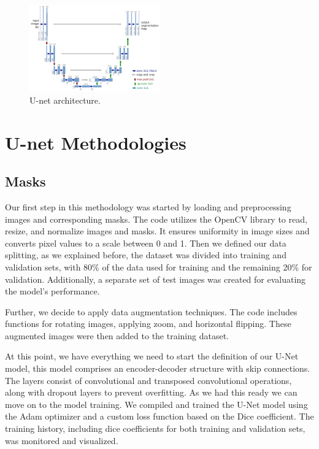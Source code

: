 \documentclass[runningheads]{llncs}
\begin{document}
\begin{figure}[H]
  \centering
  \includegraphics[width=0.5\textwidth]{u-net-architecture.png}
  \caption{U-net architecture.}
  \label{fig:unet}
\end{figure}

\section{U-net Methodologies}
\subsection{Masks}
Our first step in this methodology was started by loading and preprocessing images and corresponding masks. The code utilizes the OpenCV library to read, resize, and normalize images and masks. It ensures uniformity in image sizes and converts pixel values to a scale between 0 and 1. Then we defined our data splitting, as we explained before, the dataset was divided into training and validation sets, with 80\% of the data used for training and the remaining 20\% for validation. Additionally, a separate set of test images was created for evaluating the model's performance.

Further, we decide to apply data augmentation techniques. The code includes functions for rotating images, applying zoom, and horizontal flipping. These augmented images were then added to the training dataset.

At this point, we have everything we need to start the definition of our U-Net model, this model comprises an encoder-decoder structure with skip connections. The layers consist of convolutional and transposed convolutional operations, along with dropout layers to prevent overfitting. As we had this ready we can move on to the model training. We compiled and trained the U-Net model using the Adam optimizer and a custom loss function based on the Dice coefficient. The training history, including dice coefficients for both training and validation sets, was monitored and visualized.
\end{document}

